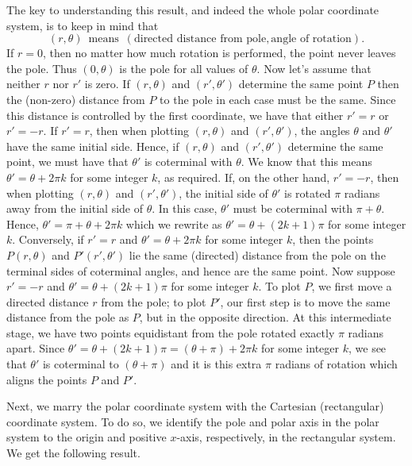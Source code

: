The key to understanding this result, and indeed the whole polar coordinate system, is to keep in mind that  
\[
(r,\theta)\, \text{ means } \,(\text{directed distance from pole}, \text{angle of rotation}).
\]
If $r = 0$, then no matter how much rotation is performed, the point never leaves the pole.  Thus $(0, \theta)$ is the pole for all values of $\theta$.  Now let's assume that neither $r$ nor $r'$ is zero.  If $\left(r, \theta\right)$ and $\left(r', \theta'\right)$ determine the same point $P$ then the (non-zero) distance from $P$ to the pole in each case must be the same.  Since this distance is controlled by the first coordinate, we have that either $r' = r$ or $r' = -r$.  If $r' = r$, then when plotting $\left(r, \theta\right)$ and $\left(r', \theta'\right)$, the angles $ \theta$ and $ \theta'$ have the same initial side.  Hence, if $\left(r, \theta\right)$ and $\left(r', \theta'\right)$ determine the same point,   we must have that $\theta'$  is coterminal with  $\theta$.  We know that this means $\theta' = \theta + 2\pi k$ for some integer $k$, as required.  If, on the other hand, $r' = -r$, then when plotting $\left(r, \theta\right)$ and $\left(r', \theta'\right)$, the initial side of $ \theta'$ is rotated $\pi$ radians away from the initial side of $\theta$.  In this case, $ \theta'$ must be coterminal with $\pi +  \theta$.  Hence, $ \theta' = \pi +  \theta + 2\pi k$ which we rewrite as $\theta' =  \theta + (2k+1)\pi$ for some integer $k$. Conversely, if $r' = r$ and $\theta' =  \theta + 2\pi k$ for some integer $k$, then  the points $P\left(r, \theta\right)$ and $P'\left(r', \theta'\right)$ lie the same (directed) distance from the pole on the terminal sides of coterminal angles, and hence are the same point.  Now suppose  $r' = -r$ and $\theta' = \theta + (2k + 1) \pi$ for some integer $k$.  To plot $P$, we first move a directed distance $r$ from the pole;  to plot $P'$, our first step is to move the same distance from the pole as $P$, but in the opposite direction.  At this intermediate stage, we have two points equidistant from the pole rotated exactly $\pi$ radians apart.  Since  $\theta' =  \theta + (2k + 1) \pi = \left(\theta + \pi\right) + 2\pi k $ for some integer $k$,  we see that $\theta'$ is coterminal to $\left(\theta + \pi\right)$ and it is this extra $\pi$ radians of rotation which aligns the points $P$ and $P'$.

\smallskip

Next, we marry the polar coordinate system with the Cartesian (rectangular) coordinate system.  To do so, we identify the pole and polar axis in the polar system to the origin and positive $x$-axis, respectively, in the rectangular system.  We get the following result.


